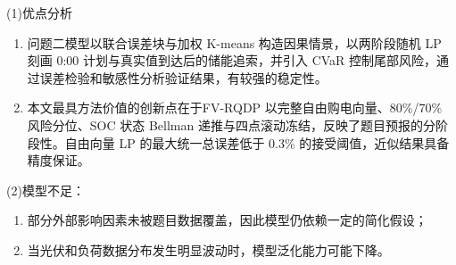 \documentclass{cumcm2026}
\begin{document}
(1)优点分析
\vspace{-0.5em}
\begin{enumerate}
  \item 问题二模型以联合误差块与加权 K-means 构造因果情景，以两阶段随机 LP 刻画 0:00 计划与真实值到达后的储能追索，并引入 CVaR 控制尾部风险，通过误差检验和敏感性分析验证结果，有较强的稳定性。
  \item 本文最具方法价值的创新点在于FV-RQDP 以完整自由购电向量、80\%/70\% 风险分位、SOC 状态 Bellman 递推与四点滚动冻结，反映了题目预报的分阶段性。自由向量 LP 的最大统一总误差低于 0.3\% 的接受阈值，近似结果具备精度保证。
\end{enumerate}

(2)模型不足：
\vspace{-0.5em}
\begin{enumerate}
  \item 部分外部影响因素未被题目数据覆盖，因此模型仍依赖一定的简化假设；
  \item 当光伏和负荷数据分布发生明显波动时，模型泛化能力可能下降。
\end{enumerate}

\vspace{-1.5em}



\end{document}

